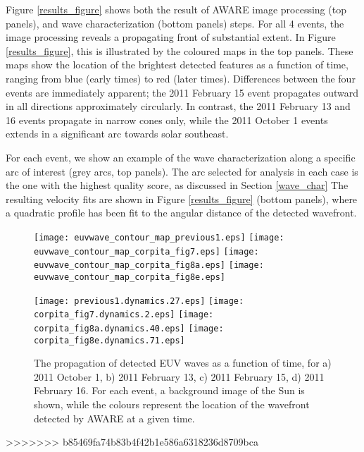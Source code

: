 Figure \ref{results_figure} shows both the result of AWARE image processing (top panels), and wave characterization (bottom panels) steps. For all 4 events, the image processing reveals a propagating front of substantial extent. In Figure \ref{results_figure}, this is illustrated by the coloured maps in the top panels. These maps show the location of the brightest detected features as a function of time, ranging from blue (early times) to red (later times). Differences between the four events are immediately apparent; the 2011 February 15 event propagates outward in all directions approximately circularly. In contrast, the 2011 February 13 and 16 events propagate in narrow cones only, while the 2011 October 1 events extends in a significant arc towards solar southeast. 

For each event, we show an example of the wave characterization along a specific arc of interest (grey arcs, top panels). The arc selected for analysis in each case is the one with the highest quality score, as discussed in Section \ref{wave_char} The resulting velocity fits are shown in Figure \ref{results_figure} (bottom panels), where a quadratic profile has been fit to the angular distance of the detected wavefront. 

\begin{figure}
\begin{center}
\texttt{[image: euvwave\_contour\_map\_previous1.eps]}
\texttt{[image: euvwave\_contour\_map\_corpita\_fig7.eps]}
\texttt{[image: euvwave\_contour\_map\_corpita\_fig8a.eps]}
\texttt{[image: euvwave\_contour\_map\_corpita\_fig8e.eps]}

\texttt{[image: previous1.dynamics.27.eps]}
\texttt{[image: corpita\_fig7.dynamics.2.eps]}
\texttt{[image: corpita\_fig8a.dynamics.40.eps]}
\texttt{[image: corpita\_fig8e.dynamics.71.eps]}
\caption{The propagation of detected EUV waves as a function of time, for a) 2011 October 1, b) 2011 February 13, c) 2011 February 15, d) 2011 February 16. For each event, a background image of the Sun is shown, while the colours represent the location of the wavefront detected by AWARE at a given time.}
\end{center}
\end{figure}




>>>>>>> b85469fa74b83b4f42b1e586a6318236d8709bca

